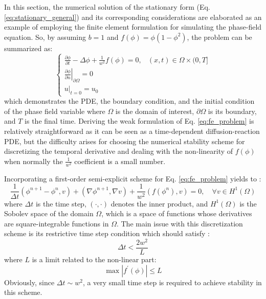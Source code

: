 In this section, the numerical solution of the stationary form (Eq. \ref{eq:stationary_general}) and its corresponding considerations are elaborated as an example of employing the finite element formulation for simulating the phase-field equation. So, by assuming $b=1$ and $f(\phi)=\phi\left(1-\phi^{2}\right)$, the problem can be summarized as:
\begin{equation} \label{eq:fe_problem}
\left\{\begin{array}{ll}
\frac{\partial \phi}{\partial t}-\Delta \phi+\frac{1}{w^{2}} f(\phi)=0, & (x, t) \in \Omega \times(0, T] \\
\left.\frac{\partial \phi}{\partial n} \right|_{\partial \Omega}=0 \\
\left.u\right|_{t=0}=u_{0}
\end{array}\right.
\end{equation}
which demonstrates the PDE, the boundary condition, and the initial condition of the phase field variable where $\Omega$ is the domain of interest, $\partial \Omega$ is its boundary, and $T$ is the final time. Deriving the weak formulation of Eq. \ref{eq:fe_problem} is relatively straightforward as it can be seen as a time-dependent diffusion-reaction PDE, but the difficulty arises for choosing the numerical stability scheme for discretizing the temporal derivative and dealing with the non-linearity of $f(\phi)$ when normally the $\frac{1}{w^{2}}$ coefficient is a small number.

Incorporating a first-order semi-explicit scheme for Eq. \ref{eq:fe_problem} yields to \cite{Abboud2019}:
\begin{equation} \label{eq:semi-implicit}
\frac{1}{\Delta t}\left(\phi^{n+1}-\phi^{n}, v\right)+\left(\nabla \phi^{n+1}, \nabla v\right)+\frac{1}{w^{2}}\left(f\left(\phi^{n}\right), v\right)=0, \quad \forall v \in H^{1}(\Omega)
\end{equation}
where $\Delta t$ is the time step, $(\cdot,\cdot)$ denotes the inner product, and $H^{1}(\Omega)$ is the Sobolev space of the domain $\Omega$, which is a space of functions whose derivatives are square-integrable functions in $\Omega$. The main issue with this discretization scheme is its restrictive time step condition which should satisfy \cite{Shen2010}:
\begin{equation}
\Delta t < \frac{2w^2}{L}
\end{equation}
where $L$ is a limit related to the non-linear part:
\begin{equation}
\max \left|f^{\prime}(\phi)\right| \leq L
\end{equation}
Obviously, since $\Delta t \sim w^2$, a very small time step is required to achieve stability in this scheme. 

